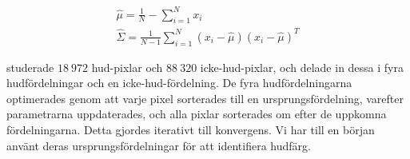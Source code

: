 \documentclass[../rapport_MVEX01-11-05]{subfiles}
\begin{document}
\begin{gather}
  \label{eq:hud:sigmamu}
  \hat\mu    =\frac{1}{N}-\sum_{i=1}^Nx_i\\
  \hat\Sigma =\frac{1}{N-1}\sum_{i=1}^N(x_i-\hat\mu)(x_i-\hat\mu)^T
\end{gather}

 studerade $18\:972$
hud-pixlar och $88\:320$ icke-hud-pixlar, och delade in dessa i fyra
hudfördelningar och en icke-hud-fördelning. De fyra hudfördelningarna
optimerades genom att varje pixel sorterades till en
ursprungsfördelning, varefter parametrarna uppdaterades, och alla
pixlar sorterades om efter de uppkomna fördelningarna. Detta gjordes
iterativt till konvergens. Vi har till en början använt deras
ursprungsfördelningar för att identifiera hudfärg.

\end{document}
